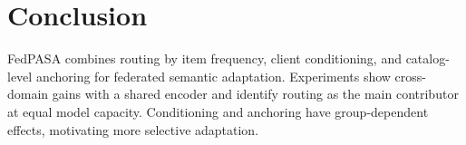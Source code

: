 \section{Conclusion}
FedPASA combines routing by item frequency, client conditioning, and catalog-level anchoring for federated semantic adaptation. Experiments show cross-domain gains with a shared encoder and identify routing as the main contributor at equal model capacity. Conditioning and anchoring have group-dependent effects, motivating more selective adaptation.

